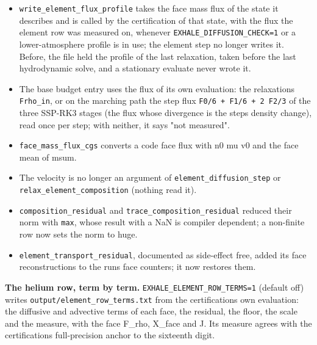 \documentclass[english,a4paper]{my_memo}
\providecommand{\tightlist}{\setlength{\itemsep}{0pt}\setlength{\parskip}{0pt}}
\begin{document}
\begin{itemize}
\tightlist
\item
  \texttt{write\_element\_flux\_profile} takes the face mass flux of the state it
  describes and is called by the certification of that state, with the flux
  the element row was measured on, whenever \texttt{EXHALE\_DIFFUSION\_CHECK=1} or a
  lower-atmosphere profile is in use; the element step no longer writes it.
  Before, the file held the profile of the last relaxation, taken before the
  last hydrodynamic solve, and a stationary evaluate never wrote it.
\item
  The base budget entry uses the flux of its own evaluation: the relaxation\textquotesingle s
  \texttt{Frho\_in}, or on the marching path the step flux \texttt{F0/6\ +\ F1/6\ +\ 2\ F2/3} of
  the three SSP-RK3 stages (the flux whose divergence is the step\textquotesingle s density
  change), read once per step; with neither, it says "not measured".
\item
  \texttt{face\_mass\_flux\_cgs} converts a code face flux with n0 mu v0 and the face
  mean of msum.
\item
  The velocity is no longer an argument of \texttt{element\_diffusion\_step} or
  \texttt{relax\_element\_composition} (nothing read it).
\item
  \texttt{composition\_residual} and \texttt{trace\_composition\_residual} reduced their norm
  with \texttt{max}, whose result with a NaN is compiler dependent; a non-finite row
  now sets the norm to huge.
\item
  \texttt{element\_transport\_residual}, documented as side-effect free, added its
  face reconstructions to the run\textquotesingle s face counters; it now restores them.
\end{itemize}

\textbf{The helium row, term by term.} \texttt{EXHALE\_ELEMENT\_ROW\_TERMS=1} (default off)
writes \texttt{output/element\_row\_terms.txt} from the certification\textquotesingle s own evaluation:
the diffusive and advective terms of each face, the residual, the floor, the
scale and the measure, with the face F\_rho, X\_face and J. Its measure agrees
with the certification\textquotesingle s full-precision anchor to the sixteenth digit.
\end{document}
